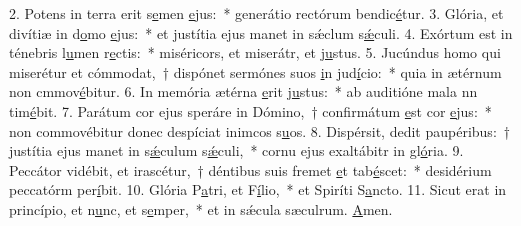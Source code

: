 2. Potens in terra erit s\uline{e}men \uline{e}jus:~* generátio rectórum bendic\uline{é}tur.
3. Glória, et divítiæ in d\uline{o}mo \uline{e}jus:~* et justítia ejus manet in sǽclum s\uline{ǽ}culi.
4. Exórtum est in ténebris l\uline{u}men r\uline{e}ctis:~* miséricors, et miserátr, et j\uline{u}stus.
5. Jucúndus homo qui miserétur et cómmodat,~† dispónet sermónes suos \uline{i}n jud\uline{í}cio:~* quia in ætérnum non cmmov\uline{é}bitur.
6. In memória ætérna \uline{e}rit j\uline{u}stus:~* ab auditióne mala nn tim\uline{é}bit.
7. Parátum cor ejus speráre in Dómino,~† confirmátum \uline{e}st cor \uline{e}jus:~* non commovébitur donec despíciat inimcos s\uline{u}os.
8. Dispérsit, dedit paupéribus:~† justítia ejus manet in s\uline{ǽ}culum s\uline{ǽ}culi,~* cornu ejus exaltábitr in gl\uline{ó}ria.
9. Peccátor vidébit, et irascétur,~† déntibus suis fremet \uline{e}t tab\uline{é}scet:~* desidérium peccatórm per\uline{í}bit.
10. Glória P\uline{a}tri, et F\uline{í}lio,~* et Spiríti S\uline{a}ncto.
11. Sicut erat in princípio, et n\uline{u}nc, et s\uline{e}mper,~* et in sǽcula sæculrum. \uline{A}men.

